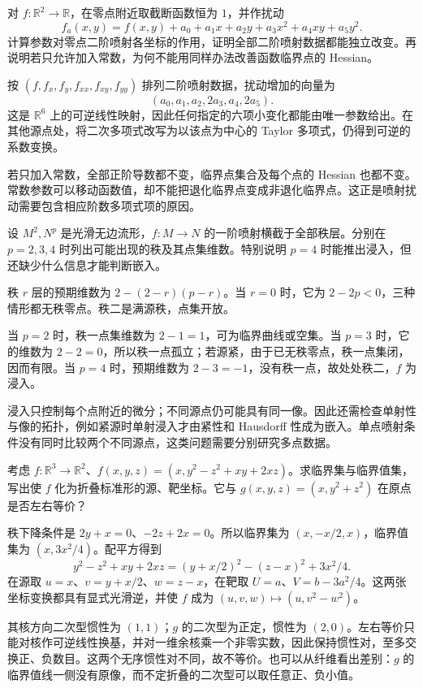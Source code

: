 \begin{exercise}\label{g2:ex:jet-polynomial-parameters}
	对 \(f:\mathbb R^2\to\mathbb R\)，在零点附近取截断函数恒为 \(1\)，并作扰动
	\[
		f_a(x,y)=f(x,y)+a_0+a_1x+a_2y+a_3x^2+a_4xy+a_5y^2.
	\]
	计算参数对零点二阶喷射各坐标的作用，证明全部二阶喷射数据都能独立改变。再说明若只允许加入常数，为何不能用同样办法改善函数临界点的 Hessian。
\end{exercise}
\begin{solution}
	按 \((f,f_x,f_y,f_{xx},f_{xy},f_{yy})\) 排列二阶喷射数据，扰动增加的向量为
	\[
		(a_0,a_1,a_2,2a_3,a_4,2a_5).
	\]
	这是 \(\mathbb R^6\) 上的可逆线性映射，因此任何指定的六项小变化都能由唯一参数给出。在其他源点处，将二次多项式改写为以该点为中心的 Taylor 多项式，仍得到可逆的系数变换。

	若只加入常数，全部正阶导数都不变，临界点集合及每个点的 Hessian 也都不变。常数参数可以移动函数值，却不能把退化临界点变成非退化临界点。这正是喷射扰动需要包含相应阶数多项式项的原因。
\end{solution}

\begin{exercise}\label{g2:ex:generic-rank-dimensions}
	设 \(M^2,N^p\) 是光滑无边流形，\(f:M\to N\) 的一阶喷射横截于全部秩层。分别在 \(p=2,3,4\) 时列出可能出现的秩及其点集维数。特别说明 \(p=4\) 时能推出浸入，但还缺少什么信息才能判断嵌入。
\end{exercise}
\begin{solution}
	秩 \(r\) 层的预期维数为 \(2-(2-r)(p-r)\)。当 \(r=0\) 时，它为 \(2-2p<0\)，三种情形都无秩零点。秩二是满源秩，点集开放。

	当 \(p=2\) 时，秩一点集维数为 \(2-1=1\)，可为临界曲线或空集。当 \(p=3\) 时，它的维数为 \(2-2=0\)，所以秩一点孤立；若源紧，由于已无秩零点，秩一点集闭，因而有限。当 \(p=4\) 时，预期维数为 \(2-3=-1\)，没有秩一点，故处处秩二，\(f\) 为浸入。

	浸入只控制每个点附近的微分；不同源点仍可能具有同一像。因此还需检查单射性与像的拓扑，例如紧源时单射浸入才由紧性和 Hausdorff 性成为嵌入。单点喷射条件没有同时比较两个不同源点，这类问题需要分别研究多点数据。
\end{solution}

\begin{exercise}\label{g2:ex:explicit-fold-completion}
	考虑 \(f:\mathbb R^3\to\mathbb R^2\)、\(f(x,y,z)=(x,y^2-z^2+xy+2xz)\)。求临界集与临界值集，写出使 \(f\) 化为折叠标准形的源、靶坐标。它与 \(g(x,y,z)=(x,y^2+z^2)\) 在原点是否左右等价？
\end{exercise}
\begin{solution}
	秩下降条件是 \(2y+x=0\)、\(-2z+2x=0\)。所以临界集为 \((x,-x/2,x)\)，临界值集为 \((x,3x^2/4)\)。配平方得到
	\[
		y^2-z^2+xy+2xz=(y+x/2)^2-(z-x)^2+3x^2/4.
	\]
	在源取 \(u=x\)、\(v=y+x/2\)、\(w=z-x\)，在靶取 \(U=a\)、\(V=b-3a^2/4\)。这两张坐标变换都具有显式光滑逆，并使 \(f\) 成为 \((u,v,w)\mapsto(u,v^2-w^2)\)。

	其核方向二次型惯性为 \((1,1)\)；\(g\) 的二次型为正定，惯性为 \((2,0)\)。左右等价只能对核作可逆线性换基，并对一维余核乘一个非零实数，因此保持惯性对，至多交换正、负数目。这两个无序惯性对不同，故不等价。也可以从纤维看出差别：\(g\) 的临界值线一侧没有原像，而不定折叠的二次型可以取任意正、负小值。
\end{solution}

